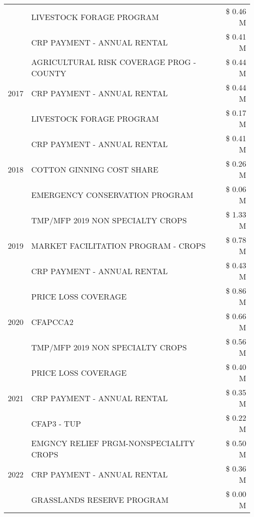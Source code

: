 \begin{tabular}{llr}
 & LIVESTOCK FORAGE PROGRAM & \$ 0.46 M \\
 & CRP PAYMENT - ANNUAL RENTAL & \$ 0.41 M \\
\cline{1-3}
\multirow[t]{3}{*}{2017} & AGRICULTURAL RISK COVERAGE PROG - COUNTY & \$ 0.44 M \\
 & CRP PAYMENT - ANNUAL RENTAL & \$ 0.44 M \\
 & LIVESTOCK FORAGE PROGRAM & \$ 0.17 M \\
\cline{1-3}
\multirow[t]{3}{*}{2018} & CRP PAYMENT - ANNUAL RENTAL & \$ 0.41 M \\
 & COTTON GINNING COST SHARE & \$ 0.26 M \\
 & EMERGENCY CONSERVATION PROGRAM & \$ 0.06 M \\
\cline{1-3}
\multirow[t]{3}{*}{2019} & TMP/MFP 2019 NON SPECIALTY CROPS & \$ 1.33 M \\
 & MARKET FACILITATION PROGRAM - CROPS & \$ 0.78 M \\
 & CRP PAYMENT - ANNUAL RENTAL & \$ 0.43 M \\
\cline{1-3}
\multirow[t]{3}{*}{2020} & PRICE LOSS COVERAGE & \$ 0.86 M \\
 & CFAPCCA2 & \$ 0.66 M \\
 & TMP/MFP 2019 NON SPECIALTY CROPS & \$ 0.56 M \\
\cline{1-3}
\multirow[t]{3}{*}{2021} & PRICE LOSS COVERAGE & \$ 0.40 M \\
 & CRP PAYMENT - ANNUAL RENTAL & \$ 0.35 M \\
 & CFAP3 - TUP & \$ 0.22 M \\
\cline{1-3}
\multirow[t]{3}{*}{2022} & EMGNCY RELIEF PRGM-NONSPECIALITY CROPS & \$ 0.50 M \\
 & CRP PAYMENT - ANNUAL RENTAL & \$ 0.36 M \\
 & GRASSLANDS RESERVE PROGRAM & \$ 0.00 M \\
\cline{1-3}
\bottomrule
\end{tabular}
